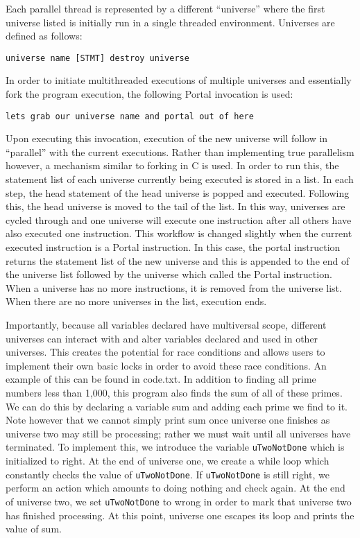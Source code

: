 \documentclass[preprint]{sigplanconf}
\begin{document}
Each parallel thread is represented by a different “universe” where the first universe listed is initially run in a single threaded environment. Universes are defined as follows:


\texttt{universe name [STMT] destroy universe}

	
In order to initiate multithreaded executions of multiple universes and essentially fork the program execution, the following Portal invocation is used:
	

\texttt{lets grab our universe name and portal out of here}

	
Upon executing this invocation, execution of the new universe will follow in “parallel” with the current executions. Rather than implementing true parallelism however, a mechanism similar to forking in C is used. In order to run this, the statement list of each universe currently being executed is stored in a list. In each step, the head statement of the head universe is popped and executed. Following this, the head universe is moved to the tail of the list. In this way, universes are cycled through and one universe will execute one instruction after all others have also executed one instruction. This workflow is changed slightly when the current executed instruction is a Portal instruction. In this case, the portal instruction returns the statement list of the new universe and this is appended to the end of the universe list followed by the universe which called the Portal instruction. When a universe has no more instructions, it is removed from the universe list. When there are no more universes in the list, execution ends.

Importantly, because all variables declared have multiversal scope, different universes can interact with and alter variables declared and used in other universes. This creates the potential for race conditions and allows users to implement their own basic locks in order to avoid these race conditions. An example of this can be found in code.txt. In addition to finding all prime numbers less than 1,000, this program also finds the sum of all of these primes. We can do this by declaring a variable sum and adding each prime we find to it. Note however that we cannot simply print sum once universe one finishes as universe two may still be processing; rather we must wait until all universes have terminated. To implement this, we introduce the variable \texttt{uTwoNotDone} which is initialized to right. At the end of universe one, we create a while loop which constantly checks the value of \texttt{uTwoNotDone}. If \texttt{uTwoNotDone} is still right, we perform an action which amounts to doing nothing and check again. At the end of universe two, we set \texttt{uTwoNotDone} to wrong in order to mark that universe two has finished processing. At this point, universe one escapes its loop and prints the value of sum.
\end{document}
